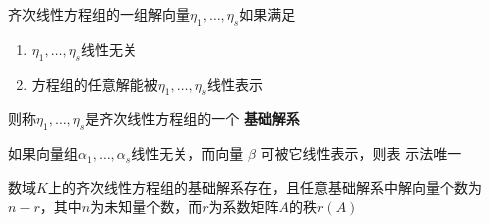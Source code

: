 \documentclass[11pt]{article}
\begin{document}
\begin{definition}[]
齐次线性方程组的一组解向量\(\eta_1,\dots,\eta_s\)如果满足
\begin{enumerate}
\item \(\eta_1,\dots,\eta_s\)线性无关
\item 方程组的任意解能被\(\eta_1,\dots,\eta_s\)线性表示
\end{enumerate}


则称\(\eta_1,\dots,\eta_s\)是齐次线性方程组的一个 \textbf{基础解系}
\end{definition}

\begin{proposition}[]
如果向量组\(\alpha_1,\dots,\alpha_s\)线性无关，而向量 \(\beta\) 可被它线性表示，则表
示法唯一
\end{proposition}

\begin{theorem}[]
数域\(K\)上的齐次线性方程组的基础解系存在，且任意基础解系中解向量个数为
\(n-r\)，其中\(n\)为未知量个数，而\(r\)为系数矩阵\(A\)的秩\(r(A)\)
\end{theorem}
\end{document}
